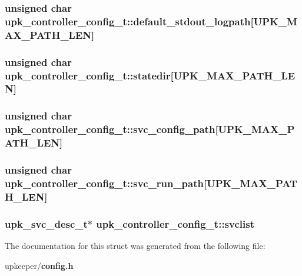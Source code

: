 \subsubsection{\setlength{\rightskip}{0pt plus 5cm}unsigned char \bf{upk\_\-controller\_\-config\_\-t::default\_\-stdout\_\-logpath}[UPK\_\-MAX\_\-PATH\_\-LEN]}\label{structupk__controller__config__t_80c1732c45aab3497e80739752bc5453}


\subsubsection{\setlength{\rightskip}{0pt plus 5cm}unsigned char \bf{upk\_\-controller\_\-config\_\-t::statedir}[UPK\_\-MAX\_\-PATH\_\-LEN]}\label{structupk__controller__config__t_a7172c6ca788d8e293f955d18e248fd5}


\subsubsection{\setlength{\rightskip}{0pt plus 5cm}unsigned char \bf{upk\_\-controller\_\-config\_\-t::svc\_\-config\_\-path}[UPK\_\-MAX\_\-PATH\_\-LEN]}\label{structupk__controller__config__t_5a4a5400b0d0c837a3ff8e9646463951}


\subsubsection{\setlength{\rightskip}{0pt plus 5cm}unsigned char \bf{upk\_\-controller\_\-config\_\-t::svc\_\-run\_\-path}[UPK\_\-MAX\_\-PATH\_\-LEN]}\label{structupk__controller__config__t_2a2183100734792aeb416ad6223802f3}


\subsubsection{\setlength{\rightskip}{0pt plus 5cm}\bf{upk\_\-svc\_\-desc\_\-t}$\ast$ \bf{upk\_\-controller\_\-config\_\-t::svclist}}\label{structupk__controller__config__t_53f6760ae78292d8332582015f045afe}




The documentation for this struct was generated from the following file:\begin{CompactItemize}
\item 
upkeeper/\bf{config.h}\end{CompactItemize}
